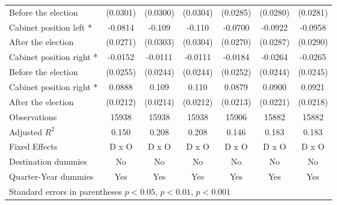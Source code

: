 \begin{table}[!ht]
\begin{tabular}{l*{6}{c}}
Before the election                    &    (0.0301)         &    (0.0300)         &    (0.0304)         &    (0.0285)         &    (0.0280)         &    (0.0281)         \\
[0,5em]
Cabinet position left *&     -0.0814\sym{**} &      -0.109\sym{***}&      -0.110\sym{***}&     -0.0700\sym{*}  &     -0.0922\sym{**} &     -0.0958\sym{**} \\
 After the election                    &    (0.0271)         &    (0.0303)         &    (0.0304)         &    (0.0270)         &    (0.0287)         &    (0.0290)         \\
[0,5em]
Cabinet position right *&     -0.0152         &     -0.0111         &     -0.0111         &     -0.0184         &     -0.0264         &     -0.0265         \\
 Before the election                    &    (0.0255)         &    (0.0244)         &    (0.0244)         &    (0.0252)         &    (0.0244)         &    (0.0245)         \\
[0,5em]
Cabinet position right * &      0.0888\sym{***}&       0.109\sym{***}&       0.110\sym{***}&      0.0879\sym{***}&      0.0900\sym{***}&      0.0921\sym{***}\\
After the election                    &    (0.0212)         &    (0.0214)         &    (0.0212)         &    (0.0213)         &    (0.0221)         &    (0.0218)         \\
\hline
Observations        &       15938         &       15938         &       15938         &       15906         &       15882         &       15882         \\
Adjusted \(R^{2}\)  &       0.150         &       0.208         &       0.208         &       0.146         &       0.183         &       0.183         \\
Fixed Effects       &       D x O         &       D x O         &       D x O         &       D x O         &       D x O         &       D x O         \\
Destination dummies &          No         &          No         &          No         &          No         &          No         &          No         \\
Quarter-Year dummies&         Yes         &         Yes         &         Yes         &         Yes         &         Yes         &         Yes         \\
\hline\hline
\multicolumn{7}{l}{Standard errors in parentheses \sym{*} \(p<0.05\), \sym{**} \(p<0.01\), \sym{***} \(p<0.001\)}\\
\end{tabular}
\end{table}
